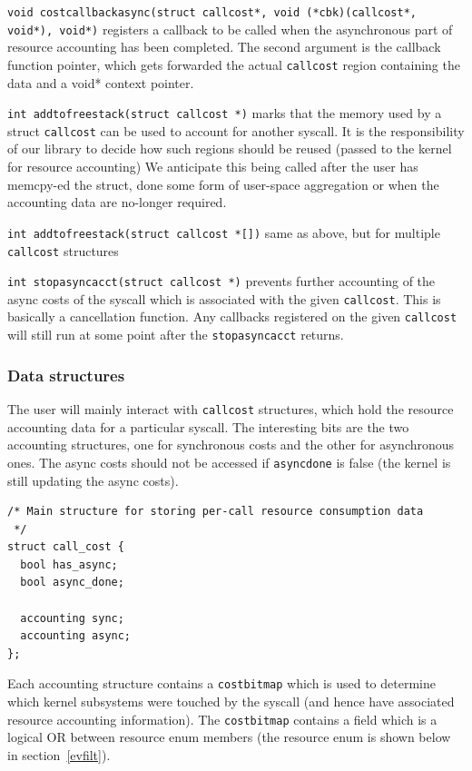\documentclass[12pt]{article}
\def\_{\textunderscore\-}
\begin{document}
{\color{blue}\texttt{void cost\_callback\_async(struct call\_cost*, void (*cbk)(call\_cost*, void*), void*)}} registers a callback to be called when the asynchronous part of resource accounting has been completed. The second argument is the callback function pointer, which gets forwarded the actual \texttt{call\_cost} region containing the data and a void* context pointer.

{\color{blue}\texttt{int add\_to\_free\_stack(struct call\_cost *)}} marks that the memory used by a struct \texttt{call\_cost} can be used to account for another syscall. It is the responsibility of our library to decide how such regions should be reused (passed to the kernel for resource accounting) We anticipate this being called after the user has memcpy-ed the struct, done some form of user-space aggregation or when the accounting data are no-longer required.

{\color{blue}\texttt{int add\_to\_free\_stack(struct call\_cost *[])}} same as above, but for multiple \texttt{call\_cost} structures

{\color{blue}\texttt{int stop\_async\_acct(struct call\_cost *)}} prevents further accounting of the async costs of the syscall which is associated with the given \texttt{call\_cost}. This is basically a cancellation function. Any callbacks registered on the given \texttt{call\_cost} will still run at some point after the \texttt{stop\_async\_acct} returns.

\subsubsection{Data structures}

The user will mainly interact with \texttt{call\_cost} structures, which hold the resource accounting data for a particular syscall. The interesting bits are the two accounting structures, one for synchronous costs and the other for asynchronous ones. The async costs should not be accessed if \texttt{async\_done} is false (the kernel is still updating the async costs).

\vspace{1em}
\begin{lstlisting}
/* Main structure for storing per-call resource consumption data
 */
struct call_cost {
  bool has_async;
  bool async_done;

  accounting sync;
  accounting async;
};
\end{lstlisting}

Each accounting structure contains a \texttt{cost\_bitmap} which is used to determine which kernel subsystems were touched by the syscall (and hence have associated resource accounting information). The \texttt{cost\_bitmap} contains a field which is a logical OR between resource enum members (the resource enum is shown below in section~\ref{evfilt}).
\end{document}
